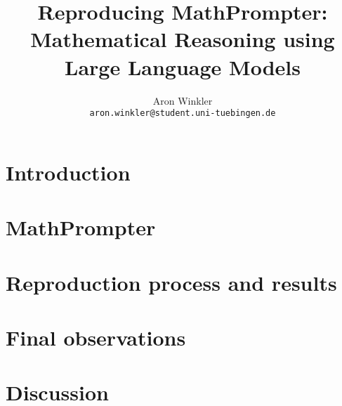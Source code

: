 \documentclass[11pt]{article}
\title{Reproducing MathPrompter: Mathematical Reasoning using Large Language Models}
\author{Aron Winkler \\
  \texttt{aron.winkler@student.uni-tuebingen.de}}
\begin{document}
\maketitle

\begin{abstract}

\end{abstract}

\section{Introduction}


\section{MathPrompter}


\section{Reproduction process and results}


\section{Final observations}


\section{Discussion}




\end{document}

